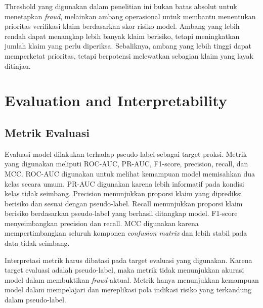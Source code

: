 Threshold yang digunakan dalam penelitian ini bukan batas absolut untuk menetapkan \emph{fraud}, melainkan ambang operasional untuk membantu menentukan prioritas verifikasi klaim berdasarkan skor risiko model. Ambang yang lebih rendah dapat menangkap lebih banyak klaim berisiko, tetapi meningkatkan jumlah klaim yang perlu diperiksa. Sebaliknya, ambang yang lebih tinggi dapat memperketat prioritas, tetapi berpotensi melewatkan sebagian klaim yang layak ditinjau.

\section{Evaluation and Interpretability}\label{evaluation-and-interpretability}

\subsection{Metrik Evaluasi}\label{metrik-evaluasi}

Evaluasi model dilakukan terhadap pseudo-label sebagai target proksi. Metrik yang digunakan meliputi ROC-AUC, PR-AUC, F1-score, precision, recall, dan MCC. ROC-AUC digunakan untuk melihat kemampuan model memisahkan dua kelas secara umum. PR-AUC digunakan karena lebih informatif pada kondisi kelas tidak seimbang. Precision menunjukkan proporsi klaim yang diprediksi berisiko dan sesuai dengan pseudo-label. Recall menunjukkan proporsi klaim berisiko berdasarkan pseudo-label yang berhasil ditangkap model. F1-score menyeimbangkan precision dan recall. MCC digunakan karena mempertimbangkan seluruh komponen \emph{confusion matrix} dan lebih stabil pada data tidak seimbang.

Interpretasi metrik harus dibatasi pada target evaluasi yang digunakan. Karena target evaluasi adalah pseudo-label, maka metrik tidak menunjukkan akurasi model dalam membuktikan \emph{fraud} aktual. Metrik hanya menunjukkan kemampuan model dalam mempelajari dan mereplikasi pola indikasi risiko yang terkandung dalam pseudo-label.

